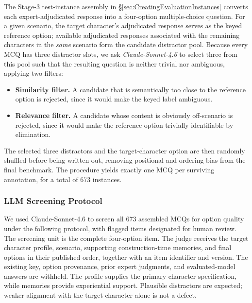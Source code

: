 \documentclass[11pt]{article}
\begin{document}
The Stage-3 test-instance assembly in \S\ref{sec:CreatingEvaluationInstances} converts each expert-adjudicated response into a four-option multiple-choice question. For a given scenario, the target character's adjudicated response serves as the keyed reference option; available adjudicated responses associated with the remaining characters in the \emph{same} scenario form the candidate distractor pool. Because every MCQ has three distractor slots, we ask \textit{Claude-Sonnet-4.6} to select three from this pool such that the resulting question is neither trivial nor ambiguous, applying two filters:
\begin{itemize}[leftmargin=1.5em, itemsep=2pt]
  \item \textbf{Similarity filter.} A candidate that is semantically too close to the reference option is rejected, since it would make the keyed label ambiguous.
  \item \textbf{Relevance filter.} A candidate whose content is obviously off-scenario is rejected, since it would make the reference option trivially identifiable by elimination.
\end{itemize}
The selected three distractors and the target-character option are then randomly shuffled before being written out, removing positional and ordering bias from the final benchmark. The procedure yields exactly one MCQ per surviving annotation, for a total of 673 instances.

\subsubsection{LLM Screening Protocol}
\label{app:mcq_screening}

We used Claude-Sonnet-4.6 to screen all 673 assembled MCQs for option quality under the following protocol, with flagged items designated for human review. The screening unit is the complete four-option item. The judge receives the target character profile, scenario, supporting construction-time memories, and final options in their published order, together with an item identifier and version. The existing key, option provenance, prior expert judgments, and evaluated-model answers are withheld. The profile supplies the primary character specification, while memories provide experiential support. Plausible distractors are expected; weaker alignment with the target character alone is not a defect.
\end{document}
